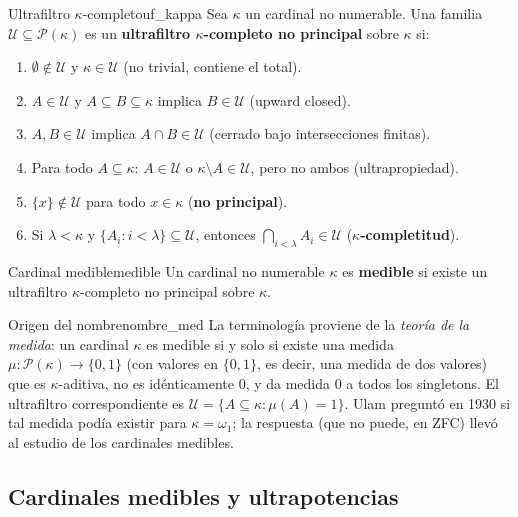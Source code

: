 \begin{definicion}{Ultrafiltro $\kappa$-completo}{uf_kappa}
Sea $\kappa$ un cardinal no numerable. Una familia $\mathcal{U} \subseteq \mathcal{P}(\kappa)$ es un \textbf{ultrafiltro $\kappa$-completo no principal} sobre $\kappa$ si:
\begin{enumerate}[leftmargin=2em, label=(\roman*)]
  \item $\emptyset \notin \mathcal{U}$ y $\kappa \in \mathcal{U}$ (no trivial, contiene el total).
  \item $A \in \mathcal{U}$ y $A \subseteq B \subseteq \kappa$ implica $B \in \mathcal{U}$ (upward closed).
  \item $A, B \in \mathcal{U}$ implica $A \cap B \in \mathcal{U}$ (cerrado bajo intersecciones finitas).
  \item Para todo $A \subseteq \kappa$: $A \in \mathcal{U}$ o $\kappa \setminus A \in \mathcal{U}$, pero no ambos (ultrapropiedad).
  \item $\{x\} \notin \mathcal{U}$ para todo $x \in \kappa$ (\textbf{no principal}).
  \item Si $\lambda < \kappa$ y $\{A_i : i < \lambda\} \subseteq \mathcal{U}$, entonces $\bigcap_{i < \lambda} A_i \in \mathcal{U}$ (\textbf{$\kappa$-completitud}).
\end{enumerate}
\end{definicion}

\begin{definicion}{Cardinal medible}{medible}
Un cardinal no numerable $\kappa$ es \textbf{medible} si existe un ultrafiltro $\kappa$-completo no principal sobre $\kappa$.
\end{definicion}

\begin{observacion}{Origen del nombre}{nombre_med}
La terminología proviene de la \emph{teoría de la medida}: un cardinal $\kappa$ es medible si y solo si existe una medida $\mu: \mathcal{P}(\kappa) \to \{0,1\}$ (con valores en $\{0,1\}$, es decir, una medida de dos valores) que es $\kappa$-aditiva, no es idénticamente $0$, y da medida $0$ a todos los singletons. El ultrafiltro correspondiente es $\mathcal{U} = \{A \subseteq \kappa : \mu(A) = 1\}$. Ulam preguntó en 1930 si tal medida podía existir para $\kappa = \omega_1$; la respuesta (que no puede, en ZFC) llevó al estudio de los cardinales medibles.
\end{observacion}

\subsection{Cardinales medibles y ultrapotencias}

